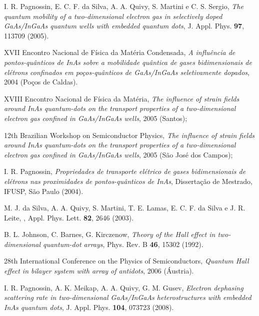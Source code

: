 \begin{thebibliography}{+++}

	 I. R. Pagnossin, E. C. F. da Silva, A. A. Quivy, S. Martini e C. S. Sergio, \textsl{The quantum mobility of a two-dimensional electron gas in selectively doped GaAs/InGaAs quantum wells with embedded quantum dots}, J. Appl. Phys. \textbf{97}, 113709 (2005).
	
	 XVII Encontro Nacional de Física da Matéria Condensada, \textsl{A influência de pontos-quânticos de InAs sobre a mobilidade quântica de gases bidimensionais de elétrons confinados em poços-quânticos de GaAs/InGaAs seletivamente dopados}, 2004 (Poços de Caldas).
	
	 XVIII Encontro Nacional de Física da Matéria, \textsl{The influence of strain fields around InAs quantum-dots on the transport properties of a two-dimensional electron gas confined in GaAs/InGaAs wells}, 2005 (Santos);
	
	 12th Brazilian Workshop on Semiconductor Physics, \textsl{The influence of strain fields around InAs quantum-dots on the transport properties of a two-dimensional electron gas confined in GaAs/InGaAs wells}, 2005 (São José dos Campos);
	
	 I. R. Pagnossin, \textsl{Propriedades de transporte elétrico de gases bidimensionais de elétrons nas proximidades de pontos-quânticos de InAs}, Dissertação de Mestrado, IFUSP, São Paulo (2004).
	
	 M. J. da Silva, A. A. Quivy, S. Martini, T. E. Lamas, E. C. F. da Silva e J. R. Leite, , Appl. Phys. Lett. \textbf{82}, 2646 (2003).
	
	 B. L. Johnson, C. Barnes, G. Kirczenow, \textsl{Theory of the Hall effect in two-dimensional quantum-dot arrays}, Phys. Rev. B \textbf{46}, 15302 (1992).
	
	 28th International Conference on the Physics of Semiconductors, \textsl{Quantum Hall effect in bilayer system with array of antidots}, 2006 (Áustria).
	
	 I. R. Pagnossin, A. K. Meikap, A. A. Quivy, G. M. Gusev, \textsl{Electron dephasing scattering rate in two-dimensional GaAs/InGaAs heterostructures with embedded InAs quantum dots}, J. Appl. Phys. \textbf{104}, 073723 (2008).
	

\end{thebibliography}
